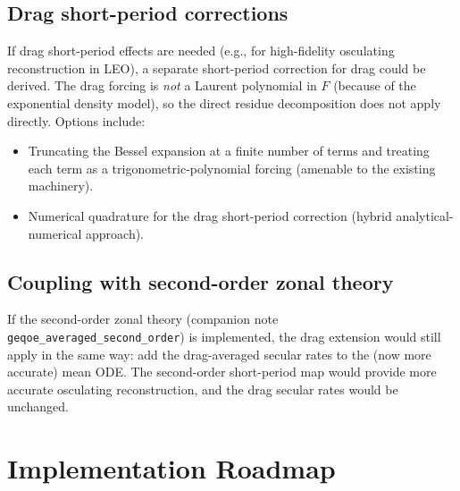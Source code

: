 \documentclass[11pt]{article}
\begin{document}
\subsection{Drag short-period corrections}

If drag short-period effects are needed (e.g., for high-fidelity osculating
reconstruction in LEO), a separate short-period correction for drag could
be derived. The drag forcing is \emph{not} a Laurent polynomial in $F$
(because of the exponential density model), so the direct residue
decomposition does not apply directly. Options include:
\begin{itemize}
\item Truncating the Bessel expansion at a finite number of terms and
treating each term as a trigonometric-polynomial forcing (amenable to the
existing machinery).
\item Numerical quadrature for the drag short-period correction (hybrid
analytical-numerical approach).
\end{itemize}

\subsection{Coupling with second-order zonal theory}

If the second-order zonal theory (companion note
\texttt{geqoe\_averaged\_second\_order}) is implemented, the drag extension
would still apply in the same way: add the drag-averaged secular rates to
the (now more accurate) mean ODE. The second-order short-period map would
provide more accurate osculating reconstruction, and the drag secular rates
would be unchanged.


\section{Implementation Roadmap}
\end{document}

